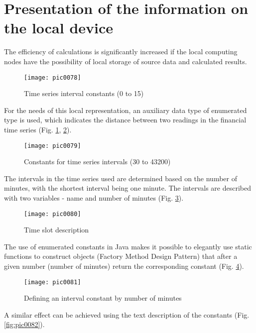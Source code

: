 \section{Presentation of the information on the local device}

The efficiency of calculations is significantly increased if the local computing nodes have the possibility of local storage of source data and calculated results.

\begin{figure}[h]
\centering
\texttt{[image: pic0078]}
\caption{Time series interval constants (0 to 15)}
\label{fig:pic0078}
\end{figure}
\FloatBarrier

For the needs of this local representation, an auxiliary data type of enumerated type is used, which indicates the distance between two readings in the financial time series (Fig. \ref{fig:pic0078}, \ref{fig:pic0079}).

\begin{figure}[h]
\centering
\texttt{[image: pic0079]}
\caption{Constants for time series intervals (30 to 43200)}
\label{fig:pic0079}
\end{figure}
\FloatBarrier

The intervals in the time series used are determined based on the number of minutes, with the shortest interval being one minute. The intervals are described with two variables - name and number of minutes (Fig. \ref{fig:pic0080}).

\begin{figure}[h]
\centering
\texttt{[image: pic0080]}
\caption{Time slot description}
\label{fig:pic0080}
\end{figure}
\FloatBarrier

The use of enumerated constants in Java makes it possible to elegantly use static functions to construct objects (Factory Method Design Pattern) that after a given number (number of minutes) return the corresponding constant (Fig. \ref{fig:pic0081}).

\begin{figure}[h]
\centering
\texttt{[image: pic0081]}
\caption{Defining an interval constant by number of minutes}
\label{fig:pic0081}
\end{figure}
\FloatBarrier

A similar effect can be achieved using the text description of the constants (Fig. \ref{fig:pic0082}).

